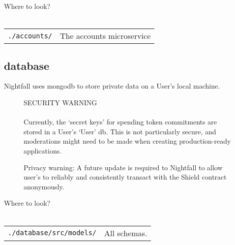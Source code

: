 \documentclass{article}
\begin{document}
\begin{center}
  \begin{mdframed}[backgroundcolor=verylightblue]
    Where to look?\\
    \\
    \begin{tabular}{lp{14cm}}
      \texttt{./accounts/} & The accounts microservice\\
    \end{tabular}
  \end{mdframed}
\end{center}

\subsection{database}
\label{sec:database}

Nightfall uses mongodb to store private data on a User's local machine.

\begin{figure}[H]
  \begin{center}
    \begin{mdframed}[backgroundcolor=verylightred]
      \noindent
      SECURITY WARNING\\
      \\
      Currently, the `secret keys' for spending token commitments are stored in a User's `User' db. This is not particularly secure, and moderations might need to be made when creating production-ready applications.
    \end{mdframed}
  \end{center}
  \caption{Privacy warning: A future update is required to Nightfall to allow user's to reliably and consistently transact with the Shield contract anonymously.}
\end{figure}


\begin{center}
  \begin{mdframed}[backgroundcolor=verylightblue]
    Where to look?\\
    \\
    \begin{tabular}{lp{14cm}}
      \texttt{./database/src/models/} & All schemas.\\
    \end{tabular}
  \end{mdframed}
\end{center}
\end{document}
